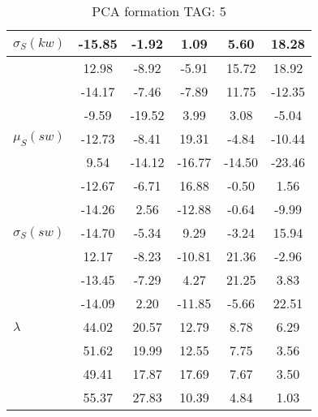 \begin{table}[h!]
\begin{center}
\begin{tabular}{| l | c | c | c | c | c |}
$\sigma_S(kw)$ & -15.85  & -1.92  & 1.09  & 5.60  & 18.28 \\\hline
 & 12.98  & -8.92  & -5.91  & 15.72  & 18.92 \\\hline
 & -14.17  & -7.46  & -7.89  & 11.75  & -12.35 \\\hline
 & -9.59  & -19.52  & 3.99  & 3.08  & -5.04 \\\hline
$\mu_S(sw)$ & -12.73  & -8.41  & 19.31  & -4.84  & -10.44 \\\hline
 & 9.54  & -14.12  & -16.77  & -14.50  & -23.46 \\\hline
 & -12.67  & -6.71  & 16.88  & -0.50  & 1.56 \\\hline
 & -14.26  & 2.56  & -12.88  & -0.64  & -9.99 \\\hline
$\sigma_S(sw)$ & -14.70  & -5.34  & 9.29  & -3.24  & 15.94 \\\hline
 & 12.17  & -8.23  & -10.81  & 21.36  & -2.96 \\\hline
 & -13.45  & -7.29  & 4.27  & 21.25  & 3.83 \\\hline
 & -14.09  & 2.20  & -11.85  & -5.66  & 22.51 \\\hline
$\lambda$ & 44.02  & 20.57  & 12.79  & 8.78  & 6.29 \\\hline
 & 51.62  & 19.99  & 12.55  & 7.75  & 3.56 \\\hline
 & 49.41  & 17.87  & 17.69  & 7.67  & 3.50 \\\hline
 & 55.37  & 27.83  & 10.39  & 4.84  & 1.03 \\\hline
\end{tabular}
\caption{PCA formation TAG: 5}
\end{center}
\end{table}